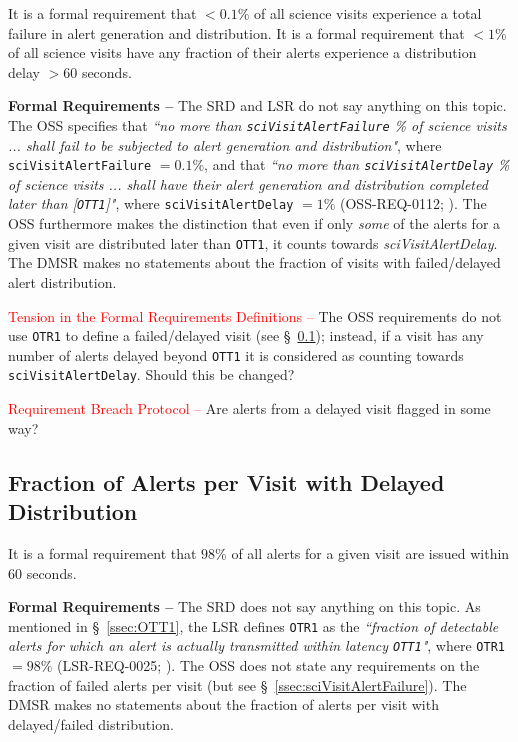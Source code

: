 \documentclass[DM,authoryear,toc]{lsstdoc}
\begin{document}
It is a formal requirement that $<0.1\%$ of all science visits experience a total failure in alert generation and distribution. It is a formal requirement that $<1\%$ of all science visits have any fraction of their alerts experience a distribution delay $>60$ seconds.

{\bf Formal Requirements --} The SRD and LSR do not say anything on this topic. The OSS specifies that {\it ``no more than {\tt sciVisitAlertFailure} \% of science visits ... shall fail to be subjected to alert generation and distribution"}, where {\tt sciVisitAlertFailure} $=0.1\%$, and that {\it ``no more than {\tt sciVisitAlertDelay} \% of science visits ... shall have their alert generation and distribution completed later than [{\tt OTT1}]"}, where {\tt sciVisitAlertDelay} $=1\%$ (OSS-REQ-0112; ). The OSS furthermore makes the distinction that even if only {\it some} of the alerts for a given visit are distributed later than {\tt OTT1}, it counts towards {\it sciVisitAlertDelay}. The DMSR makes no statements about the fraction of visits with failed/delayed alert distribution.

\textcolor{red}{Tension in the Formal Requirements Definitions --} The OSS requirements do not use {\tt OTR1} to define a failed/delayed visit (see \S~\ref{ssec:OTR1}); instead, if a visit has any number of alerts delayed beyond {\tt OTT1} it is considered as counting towards {\tt sciVisitAlertDelay}. Should this be changed?

\textcolor{red}{Requirement Breach Protocol --} Are alerts from a delayed visit flagged in some way?


\subsection{Fraction of Alerts per Visit with Delayed Distribution}\label{ssec:OTR1}

It is a formal requirement that $98\%$ of all alerts for a given visit are issued within $60$ seconds.

{\bf Formal Requirements --} The SRD does not say anything on this topic. As mentioned in \S~\ref{ssec:OTT1}, the LSR defines {\tt OTR1} as the {\it ``fraction of detectable alerts for which an alert is actually transmitted within latency {\tt OTT1}"}, where {\tt OTR1} $=98\%$ (LSR-REQ-0025; ). The OSS does not state any requirements on the fraction of failed alerts per visit (but see \S~\ref{ssec:sciVisitAlertFailure}). The DMSR makes no statements about the fraction of alerts per visit with delayed/failed distribution.
\end{document}
